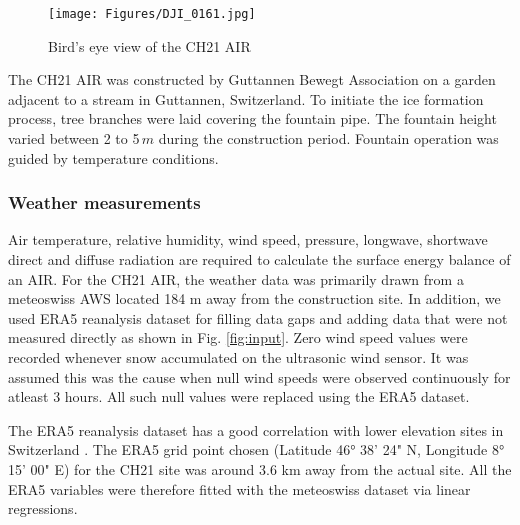 \documentclass[utf8]{frontiersSCNS} %
\begin{document}
\begin{figure} 
    \begin{center} 
        \texttt{[image: Figures/DJI\_0161.jpg]} 
    \end{center} 
\caption{Bird's eye view of the CH21 AIR} 
\label{fig:CH21site} 
\end{figure}


The CH21 AIR was constructed by Guttannen Bewegt Association on a garden adjacent to a stream in Guttannen, Switzerland.
To initiate the ice formation process, tree branches were laid covering the fountain pipe.  The fountain height varied
between 2 to 5\,$m$ during the construction period. Fountain operation was guided by temperature conditions. 

\subsubsection{Weather measurements} 
Air temperature, relative humidity, wind speed, pressure, longwave, shortwave direct and diffuse radiation are required
to calculate the surface energy balance of an AIR. For the CH21 AIR, the weather data was primarily drawn from a
meteoswiss AWS located 184 m away from the construction site.  In addition, we used ERA5 reanalysis dataset \citep{era5}
for filling data gaps and adding data that were not measured directly as shown in Fig. \ref{fig:input}. Zero wind speed
values were recorded whenever snow accumulated on the ultrasonic wind sensor. It was assumed this was the cause when
null wind speeds were observed continuously for atleast 3 hours. All such null values were replaced using the ERA5
dataset. 

The ERA5 reanalysis dataset has a good correlation with lower elevation sites in Switzerland \citep{Scherrer_2020}. The
ERA5 grid point chosen (Latitude 46° 38' 24" N, Longitude 8° 15' 00" E) for the CH21 site was around 3.6 km away from the
actual site.  All the ERA5 variables were therefore fitted with the meteoswiss dataset via linear regressions.
  
\end{document}
